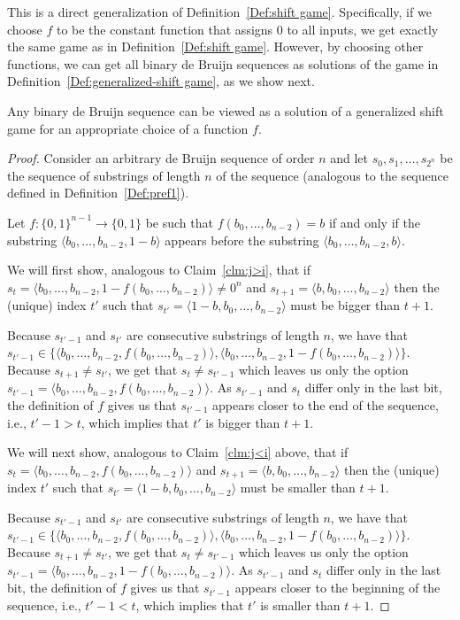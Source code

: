 \documentclass[final,12pt]{elsarticle}
\theoremstyle{definition} \newtheorem{definition}[theorem]{Definition} \newtheorem{observation}[theorem]{Observation} \newtheorem{example}[theorem]{Example} \newtheorem{remark}[theorem]{Remark} \newtheorem{corrolary}[theorem]{Corrolary}
\newcommand{\REF}[2]{#1~\ref{#2}}
\newcommand{\T}[1]{\langle{#1}\rangle}
\begin{document}
This is a direct generalization of \REF{Definition}{Def:shift game}. Specifically, if we choose $f$ to be the constant function that assigns 0 to all inputs, we get exactly the same game as in \REF{Definition}{Def:shift game}. However, by choosing other functions, we can get all binary de Bruijn sequences as solutions of the game in \REF{Definition}{Def:generalized-shift game}, as we show next.

\begin{proposition}
	Any binary de Bruijn sequence can be viewed as a solution of a generalized shift game for an appropriate choice of a function $f$.
\end{proposition}
\begin{proof}
	Consider an arbitrary de Bruijn sequence of order $n$ and let $s_0, s_1, \dots, s_{2^n}$ be the sequence of substrings of length $n$ of the sequence (analogous to the sequence defined in Definition~\ref{Def:pref1}). 
	
	Let $f\colon \{0,1\}^{n-1} \to \{0,1\}$ be such that $f(b_0,\dots,b_{n-2})=b$ if and only if the substring $\T{b_0,\dots,b_{n-2},1-b}$ appears before the substring $\T{b_0,\dots,b_{n-2},b}$. 
	
	We will first show, analogous to  Claim~\ref{clm:j>i}, that if $s_t=\langle b_0,\dots,b_{n-2},1-f(b_0,\dots,b_{n-2})\rangle \neq 0^n$ and $s_{t+1}=\langle b,b_0,\dots,b_{n-2}\rangle$ then the (unique) index $t'$ such that $s_{t'}=\T{1-b,b_0,\dots,b_{n-2}}$ must be bigger than $t+1$. 
	
	Because $s_{t'-1}$ and $s_{t'}$ are consecutive substrings of length $n$, we have that $s_{t'-1} \in \{ \langle b_0,\dots,b_{n-2},f(b_0,\dots,b_{n-2})\rangle, \langle b_0,\dots,b_{n-2},1-f(b_0,\dots,b_{n-2}) \rangle \}$. Because $s_{t+1} \neq s_{t'}$, we get that $s_{t} \neq s_{t'-1}$ which leaves us only the option $s_{t'-1}=\T{b_0,\dots,b_{n-2},f(b_0,\dots,b_{n-2})}$. As $s_{t'-1}$ and $s_{t}$ differ only in the last bit, the definition of $f$ gives us that $s_{t'-1}$ appears closer to the end of the sequence, i.e., $t'-1 > t$, which implies that $t'$ is bigger than $t+1$.

	We will next show, analogous to  Claim~\ref{clm:j<i} above, that if $s_t=\T{b_0,\dots,b_{n-2},f(b_0,\dots,b_{n-2})}$ and $s_{t+1}=\T{b,b_0,\dots,b_{n-2}}$ then the (unique) index $t'$ such that $s_{t'}=\T{1-b,b_0,\dots,b_{n-2}}$ must be smaller than $t+1$. 

	Because $s_{t'-1}$ and $s_{t'}$ are consecutive substrings of length $n$, we have that $s_{t'-1} \in \{ \langle b_0,\dots,b_{n-2},f(b_0,\dots,b_{n-2})\rangle, \langle b_0,\dots,b_{n-2},1-f(b_0,\dots,b_{n-2}) \rangle \}$. Because $s_{t+1} \neq s_{t'}$, we get that $s_{t} \neq s_{t'-1}$ which leaves us only the option $s_{t'-1}=\T{b_0,\dots,b_{n-2},1-f(b_0,\dots,b_{n-2})}$. As $s_{t'-1}$ and $s_{t}$ differ only in the last bit, the definition of $f$ gives us that $s_{t'-1}$ appears closer to the beginning of the sequence, i.e., $t'-1 < t$, which implies that $t'$ is smaller than $t+1$.
	

\end{proof}
\end{document}
